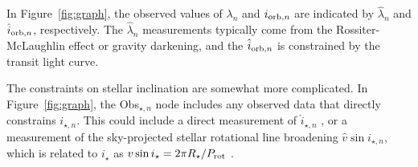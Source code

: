 \documentclass[twocolumn,times]{aastex631}
\begin{document}
In Figure~\ref{fig:graph}, the observed values of $\lambda_n$ and $i_{{\rm orb},n}$ are indicated by $\hat{\lambda}_n$ and $\hat{i}_{{\rm orb},n}$, respectively.
The $\hat{\lambda}_n$ measurements typically come from the Rossiter-McLaughlin effect or gravity darkening, and the $\hat{i}_{{\rm orb},n}$ is constrained by the transit light curve.

The constraints on stellar inclination are somewhat more complicated.
In Figure~\ref{fig:graph}, the Obs$_{\star,n}$ node includes any observed data that directly constrains $i_{\star,n}$.
This could include a direct measurement of $\hat{i}_{\star,n}$ \citep[via gravity-darkening or asteroseismology, for example][]{Barnes09, Chaplin13}, or a measurement of the sky-projected stellar rotational line broadening $\hat{v}\sin{i_{\star,n}}$, which is related to $i_\star$ as $v\sin{i_\star} = 2 \pi R_\star / P_{\rm rot}$ \citep{Masuda20}.
\end{document}
